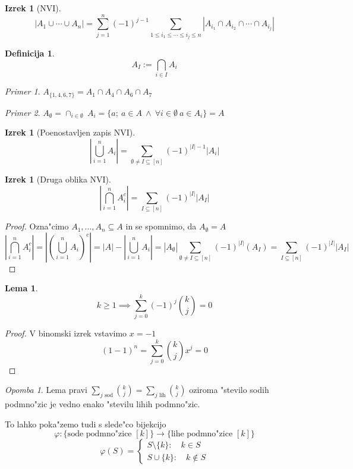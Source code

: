\documentclass[a4paper,12pt]{article}
\theoremstyle{definition}
\newtheorem{defn}[counter]{Definicija}
\newtheorem{lemma}[counter]{Lema}
\newtheorem{theorem}[counter]{Izrek}
\theoremstyle{remark}
\newtheorem*{ex}{Primer}
\newtheorem*{rem}{Opomba}
\begin{document}
\begin{theorem}[NVI]
	\[|A_1 \cup \cdots \cup A_n| = \sum_{j = 1}^{n} (-1)^{j - 1} \sum_{1 \leqslant i_1 \leqslant \cdots \leqslant i_j \leqslant n}|A_{i_1} \cap A_{i_2} \cap \cdots \cap A_{i_j}|\]
\end{theorem}
\begin{defn}
	\[A_I := \displaystyle \bigcap_{i \in I} A_i \]
\end{defn}
\begin{ex}
	$A_{\{1,4,6,7\}} = A_1 \cap A_4 \cap A_6 \cap A_7$
\end{ex}
\begin{ex}
	$A_{\emptyset} = \cap_{i \in \emptyset} \ A_i = \{a; \ a \in A \ \land \ \forall i \in \emptyset\ a \in A_i \} = A$
\end{ex}
\begin{theorem}[Poenostavljen zapis NVI]
	\[|\bigcup_{i = 1}^{n} A_i| = \sum_{\emptyset \neq I \subseteq [n]} (-1)^{|I| - 1} |A_i|\]
\end{theorem}
\begin{theorem}[Druga oblika NVI]
	\[|\bigcap_{i = 1}^n A_i^c|  = \sum_{I \subseteq [n]} (-1)^{|I|} |A_I|\]
\end{theorem}
\begin{proof}
	Ozna"cimo $A_1, \ldots, A_n \subseteq A$ in se spomnimo, da $A_\emptyset = A$
	\[
		|\bigcap_{i = 1}^n A_i^c| =
		|(\bigcup_{i = 1}^n A_i)^c| =
		|A| - |\bigcup_{i = 1}^n A_i| =
		|A_{\emptyset}|\sum_{\emptyset \neq I \subseteq [n]} (-1)^{|I|} (A_I) =
		\sum_{I \subseteq [n]} (-1)^{|I|} |A_I|
	\]
\end{proof}


\begin{lemma}
\[k \geqslant 1 \implies \sum_{j = 0}^k (-1)^j \binom{k}{j} = 0\]
\end{lemma}

\begin{proof}
	V binomski izrek vstavimo $x = -1$
	\[(1 -1)^n = \sum_{j = 0}^k \binom{k}{j} x^j = 0\]
\end{proof}

\begin{rem}
	Lema pravi $\sum_{j \text{ sod}} \binom{k}{j} = \sum_{j\text{ lih}} \binom{k}{j}$ oziroma "stevilo sodih podmno"zic je vedno enako "stevilu lihih podmno"zic.
\end{rem}

To lahko poka"zemo tudi s slede"co bijekcijo
\[\varphi: \{\text{sode podmno"zice }[k]\} \rightarrow \{\text{lihe podmno"zice }[k]\} \]
\[\varphi (S) = \begin{cases}S \setminus \{k\}: \quad k \in S  \\ S \cup \{k\}: \quad k \notin S \end{cases}\]
\end{document}
